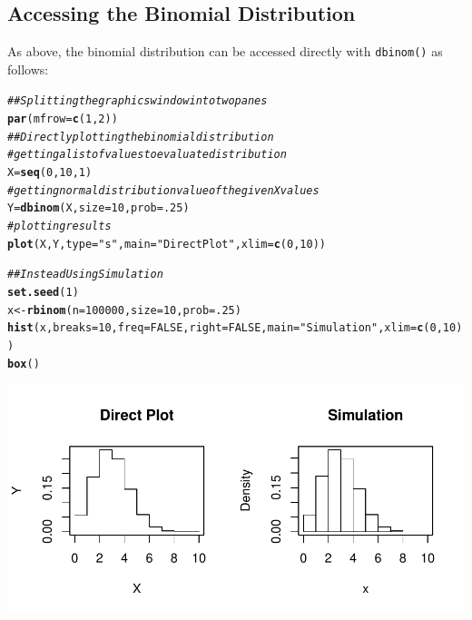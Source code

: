 \documentclass{report}\usepackage[]{graphicx}\usepackage[]{color}
\makeatletter
\def\maxwidth{ %
  \ifdim\Gin@nat@width>\linewidth
    \linewidth
  \else
    \Gin@nat@width
  \fi
}
\newcommand{\hlnum}[1]{\textcolor[rgb]{0.686,0.059,0.569}{#1}}%
\newcommand{\hlstr}[1]{\textcolor[rgb]{0.192,0.494,0.8}{#1}}%
\newcommand{\hlcom}[1]{\textcolor[rgb]{0.678,0.584,0.686}{\textit{#1}}}%
\newcommand{\hlstd}[1]{\textcolor[rgb]{0.345,0.345,0.345}{#1}}%
\newcommand{\hlkwb}[1]{\textcolor[rgb]{0.69,0.353,0.396}{#1}}%
\newcommand{\hlkwc}[1]{\textcolor[rgb]{0.333,0.667,0.333}{#1}}%
\newcommand{\hlkwd}[1]{\textcolor[rgb]{0.737,0.353,0.396}{\textbf{#1}}}%
\newenvironment{kframe}{%
 \def\at@end@of@kframe{}%
 \ifinner\ifhmode%
  \def\at@end@of@kframe{\end{minipage}}%
  \begin{minipage}{\columnwidth}%
 \fi\fi%
 \def\FrameCommand##1{\hskip\@totalleftmargin \hskip-\fboxsep
 \colorbox{shadecolor}{##1}\hskip-\fboxsep
     \hskip-\linewidth \hskip-\@totalleftmargin \hskip\columnwidth}%
 \MakeFramed {\advance\hsize-\width
   \@totalleftmargin\z@ \linewidth\hsize
   \@setminipage}}%
 {\par\unskip\endMakeFramed%
 \at@end@of@kframe}
\newenvironment{knitrout}{}{} %
\makeatother
\begin{document}
\subsection{Accessing the Binomial Distribution}
As above, the binomial distribution can be accessed directly with \texttt{dbinom()} as follows: 
\begin{knitrout}
\color{fgcolor}\begin{kframe}
\begin{alltt}
\hlcom{## Splitting the graphics window into two panes }
\hlkwd{par}\hlstd{(}\hlkwc{mfrow}\hlstd{=}\hlkwd{c}\hlstd{(}\hlnum{1}\hlstd{,}\hlnum{2}\hlstd{))}
\hlcom{## Directly plotting the binomial distribution}
 \hlcom{# getting a list of values to evaluate distribution}
\hlstd{X} \hlkwb{=} \hlkwd{seq}\hlstd{(}\hlnum{0}\hlstd{,} \hlnum{10}\hlstd{,} \hlnum{1}\hlstd{)}
 \hlcom{# getting normal distribution value of the given X values }
\hlstd{Y} \hlkwb{=} \hlkwd{dbinom}\hlstd{(X,} \hlkwc{size} \hlstd{=} \hlnum{10}\hlstd{,} \hlkwc{prob} \hlstd{=} \hlnum{.25}\hlstd{)}
 \hlcom{# plotting results }
\hlkwd{plot}\hlstd{(X,Y,} \hlkwc{type} \hlstd{=} \hlstr{"s"}\hlstd{,} \hlkwc{main} \hlstd{=} \hlstr{"Direct Plot"}\hlstd{,} \hlkwc{xlim} \hlstd{=} \hlkwd{c}\hlstd{(}\hlnum{0}\hlstd{,}\hlnum{10}\hlstd{))}

\hlcom{## Instead Using Simulation}
\hlkwd{set.seed}\hlstd{(}\hlnum{1}\hlstd{)}
\hlstd{x} \hlkwb{<-} \hlkwd{rbinom}\hlstd{(}\hlkwc{n} \hlstd{=} \hlnum{100000}\hlstd{,} \hlkwc{size} \hlstd{=} \hlnum{10}\hlstd{,} \hlkwc{prob} \hlstd{=} \hlnum{.25}\hlstd{)}
\hlkwd{hist}\hlstd{(x,} \hlkwc{breaks} \hlstd{=} \hlnum{10}\hlstd{,} \hlkwc{freq} \hlstd{=} \hlnum{FALSE}\hlstd{,}\hlkwc{right} \hlstd{=} \hlnum{FALSE}\hlstd{,} \hlkwc{main} \hlstd{=} \hlstr{"Simulation"}\hlstd{,} \hlkwc{xlim} \hlstd{=} \hlkwd{c}\hlstd{(}\hlnum{0}\hlstd{,}\hlnum{10}\hlstd{))}
\hlkwd{box}\hlstd{()}
\end{alltt}
\end{kframe}

{\centering \includegraphics[width=\maxwidth]{figure/unnamed-chunk-61-1} 

}



\end{knitrout}
\end{document}
